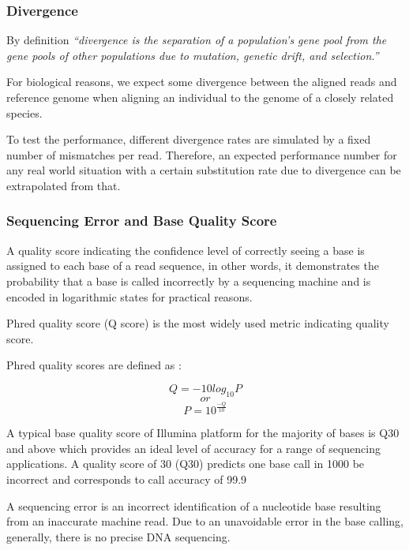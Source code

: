 \documentclass[11pt,a4paper]{report}
\newcommand{\quotes}[1]{``#1''}
\begin{document}

\subsubsection{Divergence} \label{Divergence}

By definition \emph{\quotes{divergence is the separation
of a population's gene pool from the gene pools of other populations 
due to mutation, genetic drift, and selection\cite{divergence1}.}}

For biological reasons, we expect some divergence between
the aligned reads and reference genome when aligning an individual 
to the genome of a closely related species.

To test the performance, different divergence rates are simulated by 
a fixed number of mismatches per read. Therefore, an expected performance 
number for any real world situation with a certain substitution rate due to 
divergence can be extrapolated from that.
 
 

\subsubsection{Sequencing Error and Base Quality Score} 
\label{Sequencing Error and Base Quality Score}
 

A quality score indicating the confidence level of correctly seeing a 
base is assigned to each base of a read sequence, in other words, it 
demonstrates the probability that a base is called incorrectly by a 
sequencing machine and is encoded in logarithmic states for practical 
reasons.

Phred quality score (Q score) is the most widely used metric
indicating quality score.


Phred quality scores are defined as \cite{phred2}:

$$ Q = -10  log_{10}P   $$
$$  or $$
$$ P = 10 ^ { \frac{-Q}{ 10 } } $$


A typical base quality score of Illumina platform for the majority of 
bases is Q30 and above which provides an ideal level of accuracy for a 
range of sequencing applications. 
A quality score of 30 (Q30) predicts one base call in 1000 be incorrect
and corresponds to call accuracy of 99.9%

A sequencing error is an incorrect identification of a nucleotide base 
resulting from an inaccurate machine read. Due to an unavoidable error 
in the base calling, generally, there is no precise DNA sequencing. 
\end{document}

